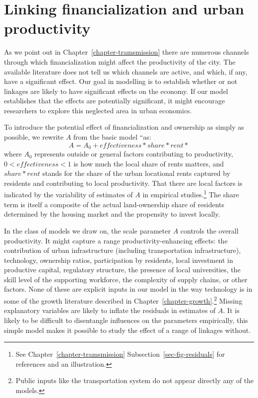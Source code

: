 \section{Linking financialization and urban productivity}
As we point out in Chapter~\ref{chapter-tramsmission} there are numerous channels through which financialization might affect the productivity of the city. The available literature does not tell us which channels are active,  and which, if any, have a significant effect. Our goal in modelling is to establish whether or not linkages are likely to have significant effects on the economy. If our model establishes that the effects are potentially significant, it might encourage researchers to explore this neglected area in urban economics.

To introduce the potential effect of financialization and ownership as simply as possible, we rewrite $A$ from the basic model ``as:\[ A= A_0 + effectiveness*share * rent*\]
where $A_0$ represents outside or general factors contributing to productivity, $0<effectiveness<1$ is how much the local share of rents matters, and  $share*rent$ stands for the share of the urban locational rents captured by residents and contributing to local productivity. That there are local factors is indicated by the variability of estimates of $A$ in empirical studies.\footnote{See Chapter~\ref{chapter-tramsmission} Subsection~\ref{sec-fig-residuals} for references and an illustration.} 
The share term is itself a composite of the actual land-ownership share of residents determined by the housing market and the propensity to invest locally.

In the class of models we draw on, the scale parameter $A$ controls the overall productivity. It might capture a range productivity-enhancing effects: the contribution of urban infrastructure (including transportation infrastructure), technology, ownership ratios, participation by residents, local investment in productive capital, regulatory structure, the presence of local universities, the skill level of the supporting workforce, the complexity of supply chains, or other factors. None of these are explicit inputs in our model in the way technology is in some of the growth literature described in Chapter~\ref{chapter-growth}.\footnote{Public inputs like the transportation system do not appear directly any of the models.} 
Missing explanatory variables are likely to inflate the residuals in estimates of $A$.
It is likely to be difficult to disentangle influences on the parameters empirically, this simple model makes it possible to study the effect of a range of linkages without. %

